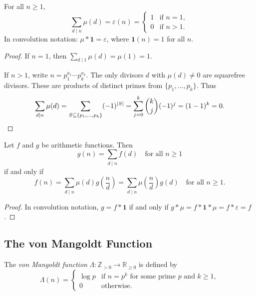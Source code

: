 \begin{proposition}
  For all $n \geq 1$,
  \begin{equation}
    \sum_{d \mid n} \mu(d) = \varepsilon(n) = \begin{cases} 1 & \text{if } n = 1, \\ 0 & \text{if } n > 1. \end{cases}
  \end{equation}
  In convolution notation: $\mu * \mathbf{1} = \varepsilon$, where $\mathbf{1}(n) = 1$ for all $n$.
\end{proposition}

\begin{proof}
  If $n = 1$, then $\sum_{d \mid 1} \mu(d) = \mu(1) = 1$.

  If $n > 1$, write $n = p_1^{a_1} \cdots p_k^{a_k}$. The only divisors $d$ with $\mu(d) \neq 0$ are squarefree divisors. These are products of distinct primes from $\{p_1, \ldots, p_k\}$. Thus
  \begin{equation}
    \sum_{d \mid n} \mu(d) = \sum_{S \subseteq \{p_1, \ldots, p_k\}} (-1)^{|S|} = \sum_{j=0}^{k} \binom{k}{j} (-1)^j = (1 - 1)^k = 0. \qedhere
  \end{equation}
\end{proof}

\begin{theorem}
  Let $f$ and $g$ be arithmetic functions. Then
  \begin{equation}
    g(n) = \sum_{d \mid n} f(d) \quad \text{for all } n \geq 1
  \end{equation}
  if and only if
  \begin{equation}
    f(n) = \sum_{d \mid n} \mu(d) g\left(\frac{n}{d}\right) = \sum_{d \mid n} \mu\left(\frac{n}{d}\right) g(d) \quad \text{for all } n \geq 1.
  \end{equation}
\end{theorem}

\begin{proof}
  In convolution notation, $g = f * \mathbf{1}$ if and only if $g * \mu = f * \mathbf{1} * \mu = f * \varepsilon = f$.
\end{proof}

\subsection{The von Mangoldt Function}

\begin{definition}
  The \emph{von Mangoldt function} $\Lambda : \mathbb{Z}_{>0} \to \mathbb{R}_{\geq 0}$ is defined by
  \begin{equation}
    \Lambda(n) = \begin{cases}
      \log p & \text{if } n = p^k \text{ for some prime } p \text{ and } k \geq 1, \\
      0      & \text{otherwise}.
    \end{cases}
  \end{equation}
\end{definition}

